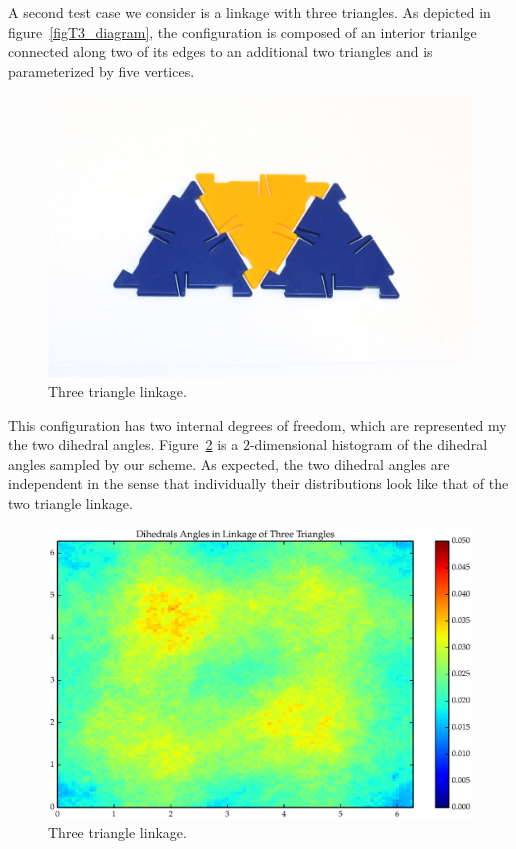 A second test case we consider is a linkage with three triangles. As depicted in figure~\ref{figT3_diagram}, the configuration is composed of an interior trianlge connected along two of its edges to an additional two triangles and is parameterized by five vertices. 
\begin{figure}[ht]
\centering
  \includegraphics[scale=0.2]{images/T3_diagram.eps}
\caption{Three triangle linkage.}
\label{fig:T3_diagram}
\end{figure}
This configuration has two internal degrees of freedom, which are represented my the two dihedral angles. Figure~\ref{fig:T3_1} is a $2$-dimensional histogram of the dihedral angles sampled by our scheme. As expected, the two dihedral angles are independent in the sense that individually their distributions look like that of the two triangle linkage.
\begin{figure}[ht]
\centering
  \includegraphics[scale=0.6]{images/T3_1_2D.eps}
\caption{Three triangle linkage.}
\label{fig:T3_1}
\end{figure}


